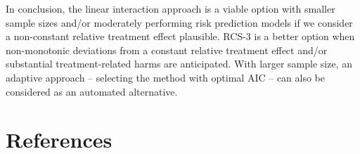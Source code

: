 \documentclass[]{elsarticle} %
\begin{document}
In conclusion, the linear interaction approach is a viable option with
smaller sample sizes and/or moderately performing risk prediction models
if we consider a non-constant relative treatment effect plausible. RCS-3
is a better option when non-monotonic deviations from a constant
relative treatment effect and/or substantial treatment-related harms are
anticipated. With larger sample size, an adaptive approach -- selecting
the method with optimal AIC -- can also be considered as an automated
alternative.

\newpage

\hypertarget{references}{%
\section{References}\label{references}}

\setlength{\parindent}{-0.25in}
\setlength{\leftskip}{0.25in}

\noindent
\end{document}
